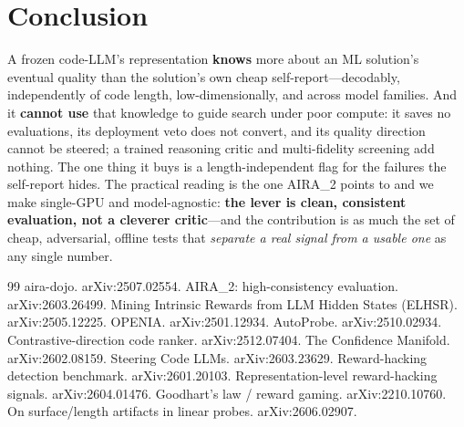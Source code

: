\documentclass[10pt]{article}
\begin{document}
\section{Conclusion}
A frozen code-LLM's representation \textbf{knows} more about an ML solution's eventual quality than the solution's own cheap self-report---decodably, independently of code length, low-dimensionally, and across model families. And it \textbf{cannot use} that knowledge to guide search under poor compute: it saves no evaluations, its deployment veto does not convert, and its quality direction cannot be steered; a trained reasoning critic and multi-fidelity screening add nothing. The one thing it buys is a length-independent flag for the failures the self-report hides. The practical reading is the one AIRA\_2 points to and we make single-GPU and model-agnostic: \textbf{the lever is clean, consistent evaluation, not a cleverer critic}---and the contribution is as much the set of cheap, adversarial, offline tests that \emph{separate a real signal from a usable one} as any single number.

\begin{thebibliography}{99}\small
{} aira-dojo. arXiv:2507.02554.
 AIRA\_2: high-consistency evaluation. arXiv:2603.26499.
 Mining Intrinsic Rewards from LLM Hidden States (ELHSR). arXiv:2505.12225.
 OPENIA. arXiv:2501.12934.
 AutoProbe. arXiv:2510.02934.
 Contrastive-direction code ranker. arXiv:2512.07404.
 The Confidence Manifold. arXiv:2602.08159.
 Steering Code LLMs. arXiv:2603.23629.
 Reward-hacking detection benchmark. arXiv:2601.20103.
 Representation-level reward-hacking signals. arXiv:2604.01476.
 Goodhart's law / reward gaming. arXiv:2210.10760.
 On surface/length artifacts in linear probes. arXiv:2606.02907.
\end{thebibliography}
\end{document}
